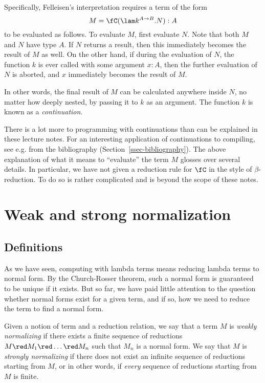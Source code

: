 \documentclass[12pt]{article}
\begin{document}
Specifically, Felleisen's interpretation requires a term of the form
\[ M = \fC(\lam k^{A\to B}.N) : A
\]
to be evaluated as follows. To evaluate $M$, first evaluate $N$.  Note
that both $M$ and $N$ have type $A$. If $N$ returns a result, then
this immediately becomes the result of $M$ as well. On the other hand,
if during the evaluation of $N$, the function $k$ is ever called with
some argument $x:A$, then the further evaluation of $N$ is aborted,
and $x$ immediately becomes the result of $M$.

In other words, the final result of $M$ can be calculated anywhere
inside $N$, no matter how deeply nested, by passing it to $k$ as an
argument. The function $k$ is known as a {\em continuation}.

There is a lot more to programming with continuations than can be
explained in these lecture notes. For an interesting application of
continuations to compiling, see e.g. {\cite{App92}} from the
bibliography (Section~\ref{ssec-bibliography}). The above explanation
of what it means to ``evaluate'' the term $M$ glosses over several
details.  In particular, we have not given a reduction rule for $\fC$
in the style of $\beta$-reduction. To do so is rather complicated and
is beyond the scope of these notes.

\section{Weak and strong normalization}

\subsection{Definitions}

As we have seen, computing with lambda terms means reducing lambda
terms to normal form. By the Church-Rosser theorem, such a normal form
is guaranteed to be unique if it exists. But so far, we have paid
little attention to the question whether normal forms exist for a
given term, and if so, how we need to reduce the term to find a normal
form. 

\begin{definition}
  Given a notion of term and a reduction relation, we say that a term
  $M$ is {\em weakly normalizing} if there exists a finite sequence of
  reductions $M\red M_1\red\ldots\red M_n$ such that $M_n$ is a normal
  form. We say that $M$ is {\em strongly normalizing} if there does
  not exist an infinite sequence of reductions starting from $M$, or
  in other words, if {\em every} sequence of reductions starting from
  $M$ is finite. 
\end{definition}
\end{document}

